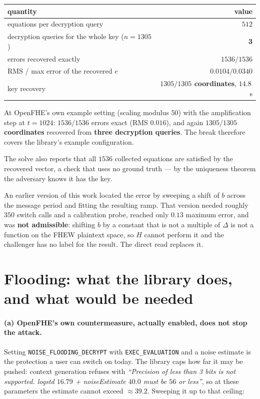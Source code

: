 \documentclass[11pt]{article}
\newcommand{\code}[1]{\texttt{#1}}
\begin{document}
\begin{table}[h]
\centering
\begin{tabular}{lr}
\toprule
quantity & value \\
\midrule
equations per decryption query & $512$ \\
decryption queries for the whole key ($n = 1305$) & \textbf{3} \\
errors recovered exactly & \textbf{$1536 / 1536$} \\
RMS / max error of the recovered $e$ & $0.0104 / 0.0340$ \\
key recovery & \textbf{$1305 / 1305$ coordinates}, $14.8$\,s \\
\bottomrule
\end{tabular}
\end{table}

At OpenFHE's own example setting (scaling modulus $50$) with the amplification step at $t = 1024$:
$1536/1536$ errors exact (RMS $0.016$), and again \textbf{$1305/1305$ coordinates} recovered from
\textbf{three decryption queries}. The break therefore covers the library's example configuration.

The solve also reports that all $1536$ collected equations are satisfied by the recovered vector, a
check that uses no ground truth --- by the uniqueness theorem the adversary knows it has the key.

An earlier version of this work located the error by sweeping a shift of $b$ across the message
period and fitting the resulting ramp. That version needed roughly $350$ switch calls and a
calibration probe, reached only $0.13$ maximum error, and was \textbf{not
admissible}: shifting $b$ by a constant that is not a multiple of $\Delta$ is not a function on the
FHEW plaintext space, so $H$ cannot perform it and the challenger has no label for the result. The
direct read replaces it.

\section{Flooding: what the library does, and what would be needed}
\label{sec:flooding}

\paragraph{(a) OpenFHE's own countermeasure, actually enabled, does not stop the attack.}
Setting \code{NOISE\_FLOODING\_DECRYPT} with \code{EXEC\_EVALUATION} and a noise estimate is the
protection a user can switch on today. The library caps how far it may be pushed: context
generation refuses with \emph{``Precision of less than 3 bits is not supported. logstd $16.79$ +
noiseEstimate $40.0$ must be $56$ or less''}, so at these parameters the estimate cannot exceed
$\approx 39.2$. Sweeping it up to that ceiling:
\end{document}
